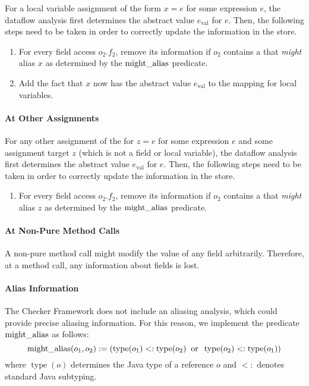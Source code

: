 For a local variable assignment of the form $x = e$ for some expression $e$,
the dataflow analysis first determines the abstract value $e_\text{val}$ for
$e$. Then, the following steps need to be taken in order to correctly update
the information in the store.
\begin{enumerate}
    \item For every field access $o_2.f_2$, remove its information if
    $o_2$ contains a  that \emph{might}
    alias $x$ as determined by the $\operatorname{might\_alias}$
    predicate.
    \item Add the fact that $x$ now has the abstract value $e_\text{val}$
    to the mapping for local variables.
\end{enumerate}

\paragraph{At Other Assignments}

For any other assignment of the for $z = e$ for some expression $e$ and some
assignment target $z$ (which is not a field or local variable),
the dataflow analysis first determines the abstract value $e_\text{val}$ for
$e$. Then, the following steps need to be taken in order to correctly update
the information in the store.
\begin{enumerate}
    \item For every field access $o_2.f_2$, remove its information if
    $o_2$ contains a  that \emph{might}
    alias $z$ as determined by the $\operatorname{might\_alias}$ predicate.
\end{enumerate}


\paragraph{At Non-Pure Method Calls}

A non-pure method call might modify the value of any field arbitrarily.
Therefore, at a method call, any information about fields is lost.


\paragraph{Alias Information}
The Checker Framework does not include an aliasing analysis, which could
provide precise aliasing information.  For this reason, we implement the
predicate $\operatorname{might\_alias}$ as follows:
\[ \operatorname{might\_alias}(o_1,o_2) :=
\left(\operatorname{type}(o_1) <: \operatorname{type}(o_2)
\;\;\text{or}\;\;
\operatorname{type}(o_2) <: \operatorname{type}(o_1) \right) \]
where $\operatorname{type}(o)$ determines the Java type of a reference $o$
and $<:$ denotes standard Java subtyping.


